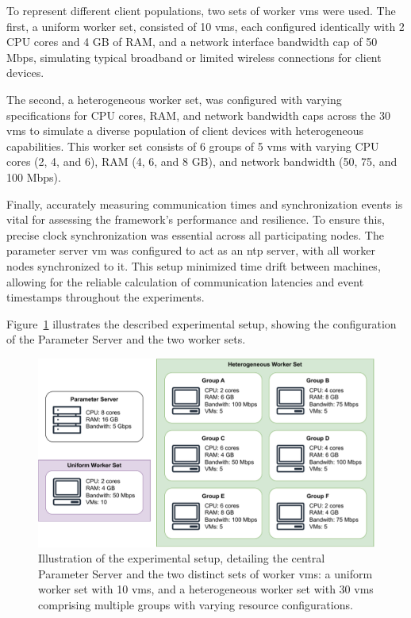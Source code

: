 To represent different client populations, two sets of worker \acp{vm} were used. The first, a uniform worker set, consisted of 10 \acp{vm}, each configured identically with 2 CPU cores and 4 GB of RAM, and a network interface bandwidth cap of 50 Mbps, simulating typical broadband or limited wireless connections for client devices. 

The second, a heterogeneous worker set, was configured with varying specifications for CPU cores, RAM, and network bandwidth caps across the 30 \acp{vm} to simulate a diverse population of client devices with heterogeneous capabilities. This worker set consists of 6 groups of 5 \acp{vm} with varying CPU cores (2, 4, and 6), RAM (4, 6, and 8 GB), and network bandwidth (50, 75, and 100 Mbps). 

Finally, accurately measuring communication times and synchronization events is vital for assessing the framework's performance and resilience. To ensure this, precise clock synchronization was essential across all participating nodes. The parameter server \ac{vm} was configured to act as an \ac{ntp} server, with all worker nodes synchronized to it. This setup minimized time drift between machines, allowing for the reliable calculation of communication latencies and event timestamps throughout the experiments.

Figure~\ref{fig:experimental-setup} illustrates the described experimental setup, showing the configuration of the Parameter Server and the two worker sets.

\begin{figure}[!htbp]
    \centering
    \includegraphics[width=\textwidth]{figs/vms.pdf}
    \caption[FL Testbed Configuration]{Illustration of the experimental setup, detailing the central Parameter Server and the two distinct sets of worker \acp{vm}: a uniform worker set with 10 \acp{vm}, and a heterogeneous worker set with 30 \acp{vm} comprising multiple groups with varying resource configurations.}
    \label{fig:experimental-setup}
\end{figure}


